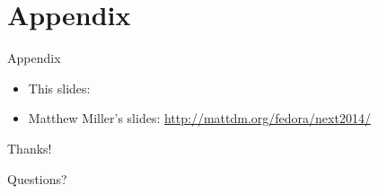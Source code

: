 \documentclass{beamer}
\begin{document}
\section*{Appendix}

\begin{frame}{Appendix}
  \begin{itemize}
    \item This slides: %
    \item Matthew Miller's slides: \url{http://mattdm.org/fedora/next2014/}
  \end{itemize}
\end{frame}

\begin{frame}
  \begin{center}
    {\LARGE Thanks!
    \bigskip

    Questions?}

  \end{center}
\end{frame}
\end{document}

